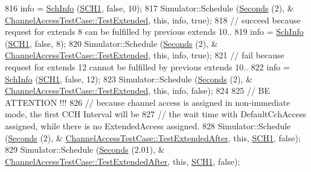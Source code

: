 \begin{DoxyCode}
816     info = \hyperlink{structns3_1_1SchInfo}{SchInfo} (\hyperlink{channel-manager_8h_a456a1b730523e5d3b8a29fb227d10028}{SCH1}, \textcolor{keyword}{false}, 10);
817     Simulator::Schedule (\hyperlink{group__timecivil_ga33c34b816f8ff6628e33d5c8e9713b9e}{Seconds} (2), &
      \hyperlink{classChannelAccessTestCase_aeacbe5638af4e2b93a53229020abd796}{ChannelAccessTestCase::TestExtended}, \textcolor{keyword}{this}, info, \textcolor{keyword}{true});
818     \textcolor{comment}{// succeed because request for extends 8 can be fulfilled by previous extends 10..}
819     info = \hyperlink{structns3_1_1SchInfo}{SchInfo} (\hyperlink{channel-manager_8h_a456a1b730523e5d3b8a29fb227d10028}{SCH1}, \textcolor{keyword}{false}, 8);
820     Simulator::Schedule (\hyperlink{group__timecivil_ga33c34b816f8ff6628e33d5c8e9713b9e}{Seconds} (2), &
      \hyperlink{classChannelAccessTestCase_aeacbe5638af4e2b93a53229020abd796}{ChannelAccessTestCase::TestExtended}, \textcolor{keyword}{this}, info, \textcolor{keyword}{true});
821     \textcolor{comment}{// fail because request for extends 12 cannot be fulfilled by previous extends 10..}
822     info = \hyperlink{structns3_1_1SchInfo}{SchInfo} (\hyperlink{channel-manager_8h_a456a1b730523e5d3b8a29fb227d10028}{SCH1}, \textcolor{keyword}{false}, 12);
823     Simulator::Schedule (\hyperlink{group__timecivil_ga33c34b816f8ff6628e33d5c8e9713b9e}{Seconds} (2), &
      \hyperlink{classChannelAccessTestCase_aeacbe5638af4e2b93a53229020abd796}{ChannelAccessTestCase::TestExtended}, \textcolor{keyword}{this}, info, \textcolor{keyword}{false});
824 
825     \textcolor{comment}{// BE ATTENTION !!!}
826     \textcolor{comment}{// because channel access is assigned in non-immediate mode, the first CCH Interval will be}
827     \textcolor{comment}{// the wait time with DefaultCchAccess assigned, while there is no ExtendedAccess assigned.}
828     Simulator::Schedule (\hyperlink{group__timecivil_ga33c34b816f8ff6628e33d5c8e9713b9e}{Seconds} (2), &
      \hyperlink{classChannelAccessTestCase_a9578cc501b608d9772c3ded4e6619c17}{ChannelAccessTestCase::TestExtendedAfter}, \textcolor{keyword}{this}, 
      \hyperlink{channel-manager_8h_a456a1b730523e5d3b8a29fb227d10028}{SCH1}, \textcolor{keyword}{false});
829     Simulator::Schedule (\hyperlink{group__timecivil_ga33c34b816f8ff6628e33d5c8e9713b9e}{Seconds} (2.01), &
      \hyperlink{classChannelAccessTestCase_a9578cc501b608d9772c3ded4e6619c17}{ChannelAccessTestCase::TestExtendedAfter}, \textcolor{keyword}{this}, 
      \hyperlink{channel-manager_8h_a456a1b730523e5d3b8a29fb227d10028}{SCH1}, \textcolor{keyword}{false});

\end{DoxyCode}
